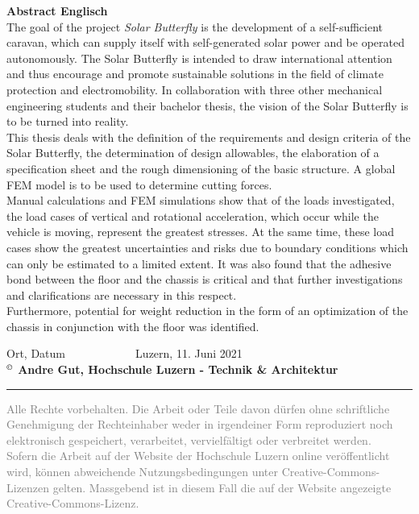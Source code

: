 \textbf{Abstract Englisch}\\
The goal of the project \emph{Solar Butterfly} is the development of a self-sufficient caravan, which can supply itself with self-generated solar power and be operated autonomously. The Solar Butterfly is intended to draw international attention and thus encourage and promote sustainable solutions in the field of climate protection and electromobility. In collaboration with three other mechanical engineering students and their bachelor thesis, the vision of the Solar Butterfly is to be turned into reality.\\
This thesis deals with the definition of the requirements and design criteria of the Solar Butterfly, the determination of design allowables, the elaboration of a specification sheet and the rough dimensioning of the basic structure. A global FEM model is to be used to determine cutting forces.\\
Manual calculations and FEM simulations show that of the loads investigated, the load cases of vertical and rotational acceleration, which occur while the vehicle is moving, represent the greatest stresses. At the same time, these load cases show the greatest uncertainties and risks due to boundary conditions which can only be estimated to a limited extent. It was also found that the adhesive bond between the floor and the chassis is critical and that further investigations and clarifications are necessary in this respect.\\
Furthermore, potential for weight reduction in the form of an optimization of the chassis in conjunction with the floor was identified.

\vspace{2cm}
Ort, Datum $\;\;\;\;\;\;\;\;\;\;\;\;\;\;\;\;\;\;\;\;$ Luzern, 11. Juni 2021\\
\textbf{{\small $^\copyright$} Andre Gut, Hochschule Luzern - Technik \& Architektur}

\vspace*{\fill}

\noindent
{\color{gray} \rule{\linewidth}{0.5px} }
\begin{footnotesize}
  \textcolor{gray}{Alle Rechte vorbehalten. Die Arbeit oder Teile davon dürfen ohne schriftliche Genehmigung der Rechteinhaber weder in irgendeiner Form reproduziert noch elektronisch gespeichert, verarbeitet, vervielfältigt oder verbreitet werden.}\\
  \textcolor{gray}{Sofern die Arbeit auf der Website der Hochschule Luzern online veröffentlicht wird, können abweichende Nutzungsbedingungen unter Creative-Commons-Lizenzen gelten. Massgebend ist in diesem Fall die auf der Website angezeigte Creative-Commons-Lizenz.}
\end{footnotesize}
\newpage
